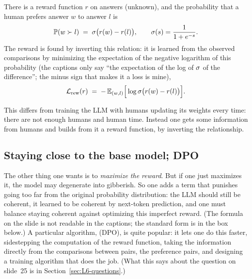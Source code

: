 \begin{defn}\label{def:L6-bt}
There is a reward function $r$ on answers (unknown), and the probability that a human prefers answer $w$ to answer $l$ is
\[
  \mathbb{P}(w\succ l)\;=\;\sigma\big(r(w)-r(l)\big),\qquad \sigma(s)=\frac1{1+e^{-s}} .
\]
The reward is found by inverting this relation: it is learned from the observed comparisons by minimizing the expectation of the negative logarithm of this probability (the captions only say ``the expectation of the log of $\sigma$ of the difference''; the minus sign that makes it a loss is mine),
\[
  \mathcal{L}_{\mathrm{rew}}(r)\;=\;-\,\mathbb{E}_{(w,l)}\Big[\log\sigma\big(r(w)-r(l)\big)\Big].
\]
\end{defn}
\noindent This differs from training the LLM with humans updating its weights every time: there are not enough humans and human time. Instead one gets some information from humans and builds from it a reward function, by inverting the relationship.

\subsection{Staying close to the base model; DPO}\label{sec:L6-kl}
The other thing one wants is to \emph{maximize the reward}. But if one just maximizes it, the model may degenerate into gibberish. So one adds a term that punishes going too far from the original probability distribution: the LLM should still be coherent, it learned to be coherent by next-token prediction, and one must balance staying coherent against optimizing this imperfect reward. (The formula on the slide is not readable in the captions; the standard form is in the box below.) A particular algorithm,  (DPO), is quite popular: it lets one do this faster, sidestepping the computation of the reward function, taking the information directly from the comparisons between pairs, the preference pairs, and designing a training algorithm that does the job. (What this says about the question on slide~25 is in Section~\ref{sec:L6-questions}.)

